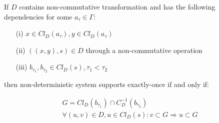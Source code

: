 \begin{theorem}
\label{necessary_conditions}
If $D$ contains non-commutative transformation and has the following dependencies for some $a_\tau \in \Gamma$:

\begin{enumerate}
  \item[(i)] $x \in Cl_D(a_\tau), y \in Cl_D(a_\tau)$
  \item[(ii)] $((x,y),s)\in D$ through a non-commutative operation
  \item[(iii)] $b_{\tau_1}, b_{\tau_2} \in Cl_D(s), \tau_1 < \tau_2$
\end{enumerate}

\noindent then non-deterministic system supports exactly-once if and only if:

\begin{equation}
\label{theorem_conditions}
  \begin{gathered}
    G = Cl_D(b_{\tau_1}) \cap C_D^{-1}(b_{\tau_2}) \\
    \forall (u, v) \in D, u \in Cl_D(s): v \subset G \Rightarrow u \subset G
  \end{gathered}
\end{equation}

\end{theorem}
